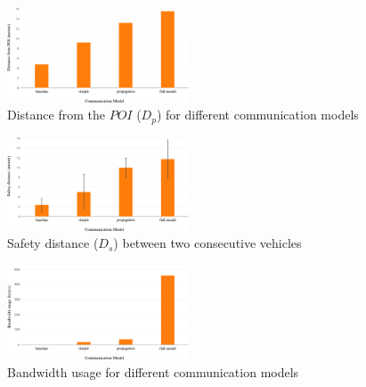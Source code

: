 \begin{figure}[t]
    \centering
    \includegraphics[width=0.48\textwidth, height=0.24\textwidth]{figures/distance_from_POI.pdf}
    \caption{Distance from the $POI$ ($D_p$) for different communication models \label{fig:distance_from_poi}}
\end{figure}

\begin{figure}[t]
    \centering
    \includegraphics[width=0.48\textwidth, height=0.24\textwidth]{figures/safety_distance.pdf}
    \caption{Safety distance ($D_s$) between two consecutive vehicles \label{fig:safety_distance}}
\end{figure}

\begin{figure}[t]
    \centering
    \includegraphics[width=0.48\textwidth, height=0.24\textwidth]{figures/bandwidth_usage.pdf}
    \caption{Bandwidth usage for different communication models \label{fig:bandwidth_usage}}
\end{figure}

